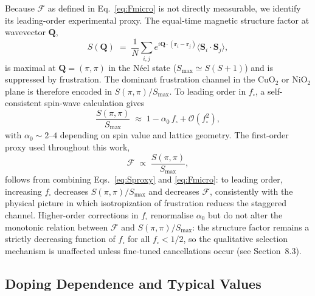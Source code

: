     Because $\mathcal{F}$ as defined in Eq.~\eqref{eq:Fmicro} is not directly measurable, we
    identify its leading-order experimental proxy.
    The equal-time magnetic structure factor at wavevector $\mathbf{Q}$,
    \begin{equation}
      S(\mathbf{Q}) \;=\; \frac{1}{N}\sum_{i,j}
      e^{i\mathbf{Q}\cdot(\mathbf{r}_i - \mathbf{r}_j)}
      \langle \mathbf{S}_i \cdot \mathbf{S}_j \rangle,
      \label{eq:Sq}
    \end{equation}
    is maximal at $\mathbf{Q} = (\pi,\pi)$ in the N\'{e}el state
    ($S_{\max} \simeq S(S+1)$) and is suppressed by frustration.
    The dominant frustration channel in the CuO$_2$ or NiO$_2$ plane is therefore encoded
    in $S(\pi,\pi)/S_{\max}$.
    To leading order in $f_\square$, a self-consistent spin-wave calculation gives
    \begin{equation}
      \frac{S(\pi,\pi)}{S_{\max}} \;\approx\; 1 - \alpha_0\, f_\square
      + \mathcal{O}(f_\square^2),
      \label{eq:Sproxy}
    \end{equation}
    with $\alpha_0 \sim 2$--$4$ depending on spin value and lattice geometry.
    The first-order proxy used throughout this work,
    \begin{equation}
      \mathcal{F} \;\propto\; \frac{S(\pi,\pi)}{S_{\max}},
      \label{eq:Fproxy}
    \end{equation}
    follows from combining Eqs.~\eqref{eq:Sproxy} and \eqref{eq:Fmicro}: to leading order,
    increasing $f_\square$ decreases $S(\pi,\pi)/S_{\max}$ and decreases $\mathcal{F}$,
    consistently with the physical picture in which isotropization of frustration reduces the
    staggered channel.
    Higher-order corrections in $f_\square$ renormalise $\alpha_0$ but do not alter the monotonic
    relation between $\mathcal{F}$ and $S(\pi,\pi)/S_{\max}$: the structure factor remains a
    strictly decreasing function of $f_\square$ for all $f_\square < 1/2$, so the qualitative
    selection mechanism is unaffected unless fine-tuned cancellations occur (see Section~8.3).

  \subsection{Doping Dependence and Typical Values}
    \label{subsec:doping-dependence-and-typical-values}

